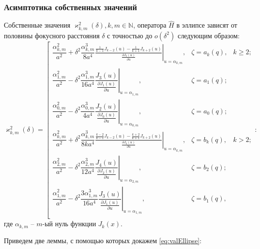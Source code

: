 \subsubsection{Асимптотика собственных значений}\label{sec:ch1/sec4/sub1/sub2}
\begin{theorem}
Собственные значения $\varkappa^2_{k,m}(\delta), k, m \in \mathbb{N}$, оператора $\hat{H}$ в эллипсе зависят от половины фокусного расстояния $\delta$ с точностью до $o(\delta^2)$ следующим образом:
{
\begin{equation}
\varkappa^2_{k,m}(\delta) = \left[
\begin{array}{ccc}
\dfrac{\alpha_{k, m}^2}{a^2} +  \delta^2 
\dfrac{\alpha_{k, m}^3}{8 a^4}
\left. \frac{\frac{1}{k-1} J_{k-2}(u) - \frac{1}{k+1}J_{k+2}(u)}{\frac{\partial J_{k} (u)}{\partial u}}\right|_{u=\alpha_{k, m}} , 
 & \zeta = a_k(q), & k \geq 2; \\
\dfrac{\alpha_{1, m}^2}{a^2} -  \delta^2 \dfrac{\alpha_{1, m}^3}{16 a^4}\left.\dfrac{J_{3}(u)}{\frac{\partial J_{1} (u)}{\partial u}}\right|_{u=\alpha_{1, m}}, & \zeta = a_1(q); \\
\dfrac{\alpha_{0, m}^2}{a^2} -  \delta^2 \dfrac{\alpha_{0, m}^3}{4 a^4}\left.\dfrac{J_{2}(u)}{\frac{\partial J_{0} (u)}{\partial u}}\right|_{u=\alpha_{0, m}},
 & \zeta = a_0(q); \\
\dfrac{\alpha_{k, m}^2}{a^2} +  \delta^2 
\dfrac{\alpha_{k, m}^3}{8 k a^4}
\left.\frac{\frac{k-2}{k-1} J_{k-2}(u) - \frac{k+2}{k+1} J_{k+2}(u)}{\frac{\partial J_{k} (u)}{\partial u}}\right|_{u=\alpha_{k, m}} , & \zeta = b_k(q), & k > 2; \\
\dfrac{\alpha_{2, m}^2}{a^2} -  \delta^2 \dfrac{\alpha_{2, m}^3}{12 a^4}\left.\dfrac{J_{4}(u)}{\frac{\partial J_{2} (u)}{\partial u}}\right|_{u=\alpha_{2, m}},
 & \zeta = b_2(q); \\
\dfrac{\alpha_{1, m}^2}{a^2} -  \delta^2 \dfrac{3\alpha_{1, m}^3}{16 a^4}\left.\dfrac{ J_{3}(u)}{\frac{\partial J_{1} (u)}{\partial u}}\right|_{u=\alpha_{1, m}},
 & \zeta = b_1(q), \\
\end{array}
\right.
\label{eq:valEllipse}:
\end{equation}
}
где $\alpha_{k, m}$ -- $m$-ый нуль функции $J_k(x)$. 
\label{th:stat4}
\end{theorem}

Приведем две леммы, с помощью которых докажем \ref{eq:valEllipse}:

